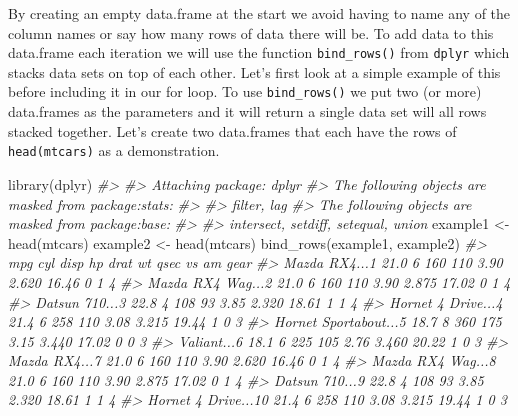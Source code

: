 \documentclass[
]{krantz}
\makeatletter
\newenvironment{Shaded}{\begin{snugshade}}{\end{snugshade}}
\newcommand{\CommentTok}[1]{\textcolor[rgb]{0.37,0.37,0.37}{\textit{#1}}}
\newcommand{\FunctionTok}[1]{\textcolor[rgb]{0,0,0}{#1}}
\newcommand{\NormalTok}[1]{#1}
\newcommand{\OtherTok}[1]{\textcolor[rgb]{0.37,0.37,0.37}{#1}}
\newenvironment{kframe}{%
\medskip{}
\setlength{\fboxsep}{.8em}
 \def\at@end@of@kframe{}%
 \ifinner\ifhmode%
  \def\at@end@of@kframe{\end{minipage}}%
  \begin{minipage}{\columnwidth}%
 \fi\fi%
 \def\FrameCommand##1{\hskip\@totalleftmargin \hskip-\fboxsep
 \colorbox{shadecolor}{##1}\hskip-\fboxsep
     \hskip-\linewidth \hskip-\@totalleftmargin \hskip\columnwidth}%
 \MakeFramed {\advance\hsize-\width
   \@totalleftmargin\z@ \linewidth\hsize
   \@setminipage}}%
 {\par\unskip\endMakeFramed%
 \at@end@of@kframe}
\renewenvironment{Shaded}{\begin{kframe}}{\end{kframe}}
\makeatother
\begin{document}
By creating an empty data.frame at the start we avoid having to name any of the column names or say how many rows of data there will be. To add data to this data.frame each iteration we will use the function \texttt{bind\_rows()} from \texttt{dplyr} which stacks data sets on top of each other. Let's first look at a simple example of this before including it in our for loop. To use \texttt{bind\_rows()} we put two (or more) data.frames as the parameters and it will return a single data set will all rows stacked together. Let's create two data.frames that each have the rows of \texttt{head(mtcars)} as a demonstration.

\begin{Shaded}
\begin{Highlighting}[]
\FunctionTok{library}\NormalTok{(dplyr)}
\CommentTok{\#\textgreater{} }
\CommentTok{\#\textgreater{} Attaching package: \textquotesingle{}dplyr\textquotesingle{}}
\CommentTok{\#\textgreater{} The following objects are masked from \textquotesingle{}package:stats\textquotesingle{}:}
\CommentTok{\#\textgreater{} }
\CommentTok{\#\textgreater{}     filter, lag}
\CommentTok{\#\textgreater{} The following objects are masked from \textquotesingle{}package:base\textquotesingle{}:}
\CommentTok{\#\textgreater{} }
\CommentTok{\#\textgreater{}     intersect, setdiff, setequal, union}
\NormalTok{example1 }\OtherTok{\textless{}{-}} \FunctionTok{head}\NormalTok{(mtcars)}
\NormalTok{example2 }\OtherTok{\textless{}{-}} \FunctionTok{head}\NormalTok{(mtcars)}
\FunctionTok{bind\_rows}\NormalTok{(example1, example2)}
\CommentTok{\#\textgreater{}                         mpg cyl disp  hp drat    wt  qsec vs am gear}
\CommentTok{\#\textgreater{} Mazda RX4...1          21.0   6  160 110 3.90 2.620 16.46  0  1    4}
\CommentTok{\#\textgreater{} Mazda RX4 Wag...2      21.0   6  160 110 3.90 2.875 17.02  0  1    4}
\CommentTok{\#\textgreater{} Datsun 710...3         22.8   4  108  93 3.85 2.320 18.61  1  1    4}
\CommentTok{\#\textgreater{} Hornet 4 Drive...4     21.4   6  258 110 3.08 3.215 19.44  1  0    3}
\CommentTok{\#\textgreater{} Hornet Sportabout...5  18.7   8  360 175 3.15 3.440 17.02  0  0    3}
\CommentTok{\#\textgreater{} Valiant...6            18.1   6  225 105 2.76 3.460 20.22  1  0    3}
\CommentTok{\#\textgreater{} Mazda RX4...7          21.0   6  160 110 3.90 2.620 16.46  0  1    4}
\CommentTok{\#\textgreater{} Mazda RX4 Wag...8      21.0   6  160 110 3.90 2.875 17.02  0  1    4}
\CommentTok{\#\textgreater{} Datsun 710...9         22.8   4  108  93 3.85 2.320 18.61  1  1    4}
\CommentTok{\#\textgreater{} Hornet 4 Drive...10    21.4   6  258 110 3.08 3.215 19.44  1  0    3}

\end{Highlighting}
\end{Shaded}
\end{document}

